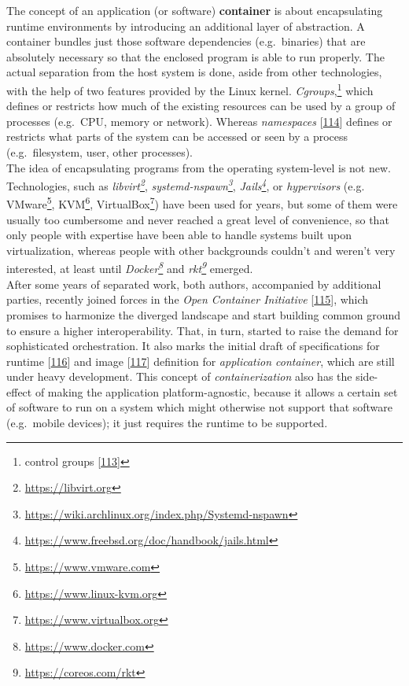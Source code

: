 \documentclass[12pt,english,a4paper,titlepage,cleardoublepage=empty,dottedtoc]{report}
\renewcommand{\href}[2]{#2\footnote{\url{#1}}}
\begin{document}
The concept of an application (or software)
\textbf{\protect\hypertarget{def--container}{}{container}} is about
encapsulating runtime environments by introducing an additional layer of
abstraction. A container bundles just those software dependencies
(e.g.~binaries) that are absolutely necessary so that the enclosed
program is able to run properly. The actual separation from the host
system is done, aside from other technologies, with the help of two
features provided by the Linux kernel. \emph{Cgroups},\footnote{control
  groups {[}\protect\hyperlink{ref-web_2015_cgroup-doc}{113}{]}} which
defines or restricts how much of the existing resources can be used by a
group of processes (e.g.~CPU, memory or network). Whereas
\emph{namespaces}
{[}\protect\hyperlink{ref-web_2016_kernel-namespace}{114}{]} defines or
restricts what parts of the system can be accessed or seen by a process
(e.g.~filesystem, user, other processes).\\
The idea of encapsulating programs from the operating system-level is
not new. Technologies, such as
\emph{\href{https://libvirt.org}{libvirt}},
\emph{\href{https://wiki.archlinux.org/index.php/Systemd-nspawn}{systemd-nspawn}},
\emph{\href{https://www.freebsd.org/doc/handbook/jails.html}{Jails}}, or
\emph{hypervisors} (e.g. \href{https://www.vmware.com}{VMware},
\href{https://www.linux-kvm.org}{KVM},
\href{https://www.virtualbox.org}{VirtualBox}) have been used for years,
but some of them were usually too cumbersome and never reached a great
level of convenience, so that only people with expertise have been able
to handle systems built upon virtualization, whereas people with other
backgrounds couldn't and weren't very interested, at least until
\emph{\href{https://www.docker.com}{Docker}} and
\emph{\href{https://coreos.com/rkt}{rkt}} emerged.\\
After some years of separated work, both authors, accompanied by
additional parties, recently joined forces in the \emph{Open Container
Initiative}
{[}\protect\hyperlink{ref-web_2016_open-container-initiative}{115}{]},
which promises to harmonize the diverged landscape and start building
common ground to ensure a higher interoperability. That, in turn,
started to raise the demand for sophisticated orchestration. It also
marks the initial draft of specifications for runtime
{[}\protect\hyperlink{ref-web_oci-spec_runtime}{116}{]} and image
{[}\protect\hyperlink{ref-web_oci-spec_image}{117}{]} definition for
\emph{application container}, which are still under heavy development.
This concept of \emph{containerization} also has the side-effect of
making the application platform-agnostic, because it allows a certain
set of software to run on a system which might otherwise not support
that software (e.g.~mobile devices); it just requires the runtime to be
supported.
\end{document}
